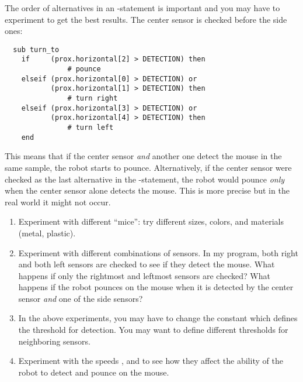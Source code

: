 The order of alternatives in an -statement is important and you
may have to experiment to get the best results. The center sensor is
checked before the side ones:

\begin{verbatim}
  sub turn_to
    if     (prox.horizontal[2] > DETECTION) then
               # pounce
    elseif (prox.horizontal[0] > DETECTION) or
           (prox.horizontal[1] > DETECTION) then
               # turn right
    elseif (prox.horizontal[3] > DETECTION) or
           (prox.horizontal[4] > DETECTION) then
               # turn left
    end
\end{verbatim}
This means that if the center sensor \emph{and} another one detect the
mouse in the same sample, the robot starts to pounce. Alternatively,
if the center sensor were checked as the last alternative in the
-statement, the robot would pounce \emph{only} when the center
sensor alone detects the mouse. This is more precise but in the real
world it might not occur.



\begin{enumerate}

\item Experiment with different ``mice'': try different sizes,
colors, and materials (metal, plastic).

\item Experiment with different combinations of sensors. In my program,
both right and both left sensors are checked to see if they detect the
mouse. What happens if only the rightmost and leftmost sensors are
checked? What happens if the robot pounces on the mouse when it is
detected by the center sensor \emph{and} one of the side sensors?

\item In the above experiments, you may have to change the constant
 which defines the threshold for detection. You may want to
define different thresholds for neighboring sensors.

\item Experiment with the speeds ,  and  to
see how they affect the ability of the robot to detect and pounce on the
mouse.

\end{enumerate}